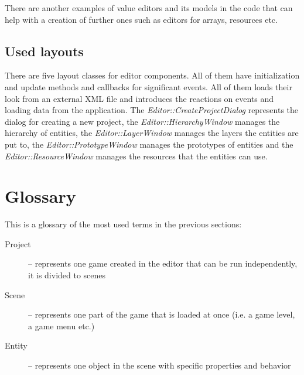There are another examples of value editors and its models in the code that can help with a creation of further ones such as editors for arrays, resources etc.

\subsection{Used layouts}

There are five layout classes for editor components. All of them have initialization and update methods and callbacks for significant events. All of them loads their look from an external XML file and introduces the reactions on events and loading data from the application. The \emph{Editor::Create\-Project\-Dialog} represents the dialog for creating a new project, the \emph{Editor\-::\-Hierarchy\-Window} manages the hierarchy of entities, the \emph{Editor\-::\-Layer\-Window} manages the layers the entities are put to, the \emph{Editor\-::\-Prototype\-Window} manages the prototypes of entities and the \emph{Editor\-::\-Resource\-Window} manages the resources that the entities can use.

\section{Glossary}
This is a glossary of the most used terms in the previous sections:

\begin{description}
  \item[Project] -- represents one game created in the editor that can be run independently, it is divided to scenes
  \item[Scene] -- represents one part of the game that is loaded at once (i.e. a game level, a game menu etc.)
  \item[Entity] -- represents one object in the scene with specific properties and behavior
\end{description}
